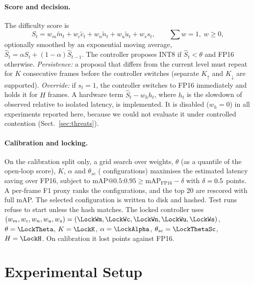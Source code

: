 \documentclass{svproc}
\begin{document}
\paragraph{Score and decision.} The difficulty score is
\begin{equation}
S_t = w_m\tilde m_t + w_c\tilde c_t + w_n\tilde n_t + w_u\tilde u_t + w_s s_t,\qquad \textstyle\sum w = 1,\; w\ge 0,
\end{equation}
optionally smoothed by an exponential moving average, $\hat S_t=\alpha S_t+(1-\alpha)\hat S_{t-1}$. The controller proposes INT8 if
$\hat S_t<\theta$ and FP16 otherwise. \emph{Persistence:} a proposal that differs from the current level must repeat for $K$
consecutive frames before the controller switches (separate $K_{\uparrow}$ and $K_{\downarrow}$ are supported).
\emph{Override:} if $s_t=1$, the controller switches to FP16 immediately and holds it for $H$ frames. A hardware term
$\hat S_t - w_h h_t$, where $h_t$ is the slowdown of observed relative to isolated latency, is implemented. It is disabled
($w_h=0$) in all experiments reported here, because we could not evaluate it under controlled contention (Sect.~\ref{sec:threats}).

\paragraph{Calibration and locking.} On the calibration split only, a grid search over weights, $\theta$ (as a quantile of the
open-loop score), $K$, $\alpha$ and $\theta_{sc}$ (\CalibConfigs{} configurations) maximises the estimated latency saving
over FP16, subject to $\text{mAP@0.5:0.95}\ge \text{mAP}_\text{FP16}-\delta$ with $\delta=0.5$ points. A per-frame F1 proxy
ranks the configurations, and the top 20 are rescored with full mAP. The selected configuration is written to disk and
hashed. Test runs refuse to start unless the hash matches. The locked controller uses
$(w_m,w_c,w_n,w_u,w_s)=(\LockWm,\allowbreak\LockWc,\allowbreak\LockWn,\allowbreak\LockWu,\allowbreak\LockWs)$, $\theta=\LockTheta$, $K=\LockK$, $\alpha=\LockAlpha$,
$\theta_{sc}=\LockThetaSc$, $H=\LockH$. On calibration it lost \CalibDropMain{} points against FP16.

\section{Experimental Setup}\label{sec:setup}
\end{document}
